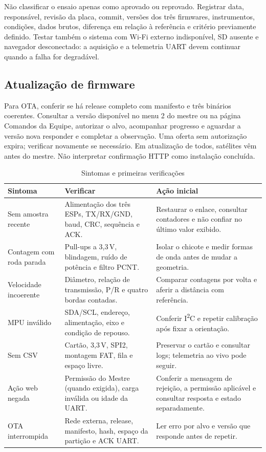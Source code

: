 Não classificar o ensaio apenas como aprovado ou reprovado. Registrar data, responsável, revisão da placa, commit, versões dos três firmwares, instrumentos, condições, dados brutos, diferença em relação à referência e critério previamente definido. Testar também o sistema com Wi-Fi externo indisponível, SD ausente e navegador desconectado: a aquisição e a telemetria UART devem continuar quando a falha for degradável.

\subsection{Atualização de firmware}
Para OTA, conferir se há release completo com manifesto e três binários coerentes. Consultar a versão disponível no menu 2 do mestre ou na página Comandos da Equipe, autorizar o alvo, acompanhar progresso e aguardar a versão nova responder e completar a observação. Uma oferta sem autorização expira; verificar novamente se necessário. Em atualização de todos, satélites vêm antes do mestre. Não interpretar confirmação HTTP como instalação concluída.

\begin{table}[htbp]\centering\small
\caption{Sintomas e primeiras verificações}\label{tab:diagnostico}
\begin{tabularx}{\textwidth}{@{}l X X@{}}\toprule
Sintoma & Verificar & Ação inicial\\\midrule
Sem amostra recente & Alimentação dos três ESPs, TX/RX/GND, baud, CRC, sequência e ACK. & Restaurar o enlace, consultar contadores e não confiar no último valor exibido.\\
Contagem com roda parada & Pull-ups a 3,3\,V, blindagem, ruído de potência e filtro PCNT. & Isolar o chicote e medir formas de onda antes de mudar a geometria.\\
Velocidade incoerente & Diâmetro, relação de transmissão, P/R e quatro bordas contadas. & Comparar contagens por volta e aferir a distância com referência.\\
MPU inválido & SDA/SCL, endereço, alimentação, eixo e condição de repouso. & Conferir I\textsuperscript{2}C e repetir calibração após fixar a orientação.\\
Sem CSV & Cartão, 3,3\,V, SPI2, montagem FAT, fila e espaço livre. & Preservar o cartão e consultar logs; telemetria ao vivo pode seguir.\\
Ação web negada & Permissão do Mestre (quando exigida), carga inválida ou idade da UART. & Conferir a mensagem de rejeição, a permissão aplicável e consultar resposta e estado separadamente.\\
OTA interrompida & Rede externa, release, manifesto, hash, espaço da partição e ACK UART. & Ler erro por alvo e versão que responde antes de repetir.\\\bottomrule
\end{tabularx}\end{table}

